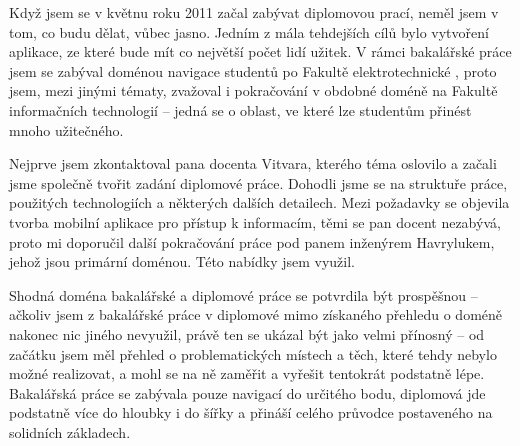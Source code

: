 \begin{introduction}
Když jsem se v květnu roku 2011 začal zabývat diplomovou prací, neměl jsem v tom, co budu dělat, vůbec jasno. Jedním z mála tehdejších cílů bylo vytvoření aplikace, ze které bude mít co největší počet lidí užitek. V rámci bakalářské práce jsem se zabýval doménou navigace studentů po Fakultě elektrotechnické  \cite{Bakalarka}, proto jsem, mezi jinými tématy, zvažoval i pokračování v obdobné doméně na Fakultě informačních technologií -- jedná se o oblast, ve které lze studentům přinést mnoho užitečného.

Nejprve jsem zkontaktoval pana docenta Vitvara, kterého téma oslovilo a začali jsme společně tvořit zadání diplomové práce. Dohodli jsme se na struktuře práce, použitých technologiích a některých dalších detailech. Mezi požadavky se objevila tvorba mobilní aplikace pro přístup k informacím, těmi se pan docent nezabývá, proto mi doporučil další pokračování práce pod panem inženýrem Havrylukem, jehož jsou primární doménou. Této nabídky jsem využil.

Shodná doména bakalářské a diplomové práce se potvrdila být prospěšnou -- ačkoliv jsem z bakalářské práce v diplomové mimo získaného přehledu o doméně nakonec nic jiného nevyužil, právě ten se ukázal být jako velmi přínosný -- od začátku jsem měl přehled o problematických místech a těch, které tehdy nebylo možné realizovat, a mohl se na ně zaměřit a vyřešit tentokrát podstatně lépe. Bakalářská práce se zabývala pouze navigací do určitého bodu, diplomová jde podstatně více do hloubky i do šířky a přináší celého průvodce postaveného na solidních základech.
\end{introduction}
